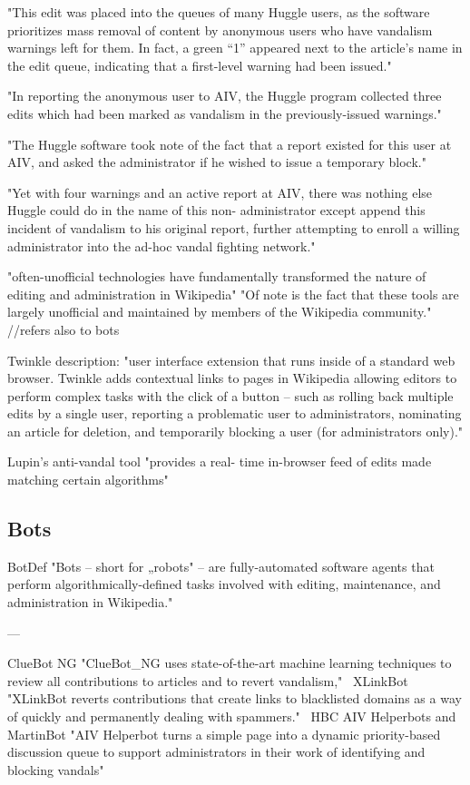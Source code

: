 "This edit was placed into the queues of many
Huggle users, as the software prioritizes mass removal of
content by anonymous users who have vandalism warnings
left for them. In fact, a green “1” appeared next to the
article's name in the edit queue, indicating that a first-level
warning had been issued."

"In reporting the anonymous user to
AIV, the Huggle program collected three edits which had been
marked as vandalism in the previously-issued warnings."

"The Huggle software took note of the
fact that a report existed for this user at AIV, and asked the
administrator if he wished to issue a temporary block."

"Yet with four warnings and an active report at AIV, there was
nothing else Huggle could do in the name of this non-
administrator except append this incident of vandalism to his
original report, further attempting to enroll a willing
administrator into the ad-hoc vandal fighting network."

\cite{GeiRib2010}
"often-unofficial technologies have fundamentally
transformed the nature of editing and administration in
Wikipedia"
"Of note is the fact that these tools are largely
unofficial and maintained by members of the Wikipedia
community."
//refers also to bots

\cite{GeiRib2010}
Twinkle description:
"user interface extension that runs inside
of a standard web browser. Twinkle adds contextual links to
pages in Wikipedia allowing editors to perform complex tasks
with the click of a button – such as rolling back multiple edits
by a single user, reporting a problematic user to
administrators, nominating an article for deletion, and
temporarily blocking a user (for administrators only)."

Lupin's anti-vandal tool
"provides a real-
time in-browser feed of edits made matching certain
algorithms"

\subsection{Bots}

\cite{GeiRib2010}
BotDef
"Bots – short for „robots" – are fully-automated software
agents that perform algorithmically-defined tasks involved
with editing, maintenance, and administration in Wikipedia."

---

ClueBot NG
"ClueBot\_NG uses state-of-the-art machine learning techniques to review all contributions to
articles and to revert vandalism,"~\cite{HalRied2012}
XLinkBot
"XLinkBot reverts contributions that create links to
blacklisted domains as a way of quickly and permanently dealing with spammers."~\cite{HalRied2012}
HBC AIV Helperbots and MartinBot
"AIV Helperbot turns a simple page into a dynamic
priority-based discussion queue to support administrators in their work of identifying and
blocking vandals"~\cite{HalRied2012}

